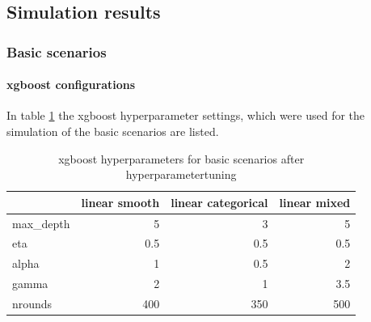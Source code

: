 \clearpage
\subsection{Simulation results}
\subsubsection{Basic scenarios}

\paragraph{xgboost configurations}
In table \ref{tab:app_xgboost_config} the xgboost hyperparameter settings, which were used for the simulation of the basic scenarios are listed.
\begin{table}[!htb]
    \centering
    \begin{tabular}{l|r|r|r}
    \hline
    & linear smooth & linear categorical & linear mixed \\
    \hline
    max\_depth & 5 & 3 & 5 \\
    eta & 0.5 & 0.5 & 0.5 \\
    alpha & 1 & 0.5 & 2 \\
    gamma & 2 & 1 & 3.5 \\
    nrounds & 400 & 350 & 500\\
    \hline
    \end{tabular}
    \caption{xgboost hyperparameters for basic scenarios after hyperparametertuning}
    \label{tab:app_xgboost_config}
\end{table}


